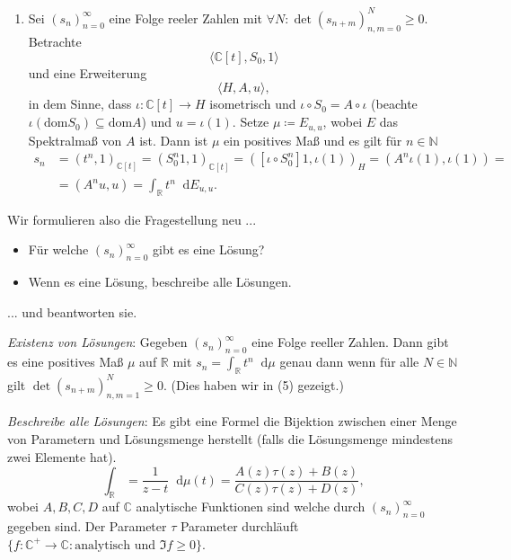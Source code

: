 \documentclass[letterpaper, 11pt]{article}
\newcommand{\R}{\mathbb{R}}
\newcommand{\C}{\mathbb{C}}
\newcommand{\N}{\mathbb{N}}
\newcommand{\1}{\mathds{1}}
\newcommand{\dd}{\mathop{}\!\mathrm{d}}
\theoremstyle{definition}
\begin{document}
\begin{enumerate}
  \item Sei $(s_n)_{n=0}^\infty$ eine Folge reeler Zahlen mit $\forall N : \det (s_{n+m})_{n,m=0}^N \geq 0$. Betrachte
  $$ \langle \C[t], S_0, 1 \rangle $$
  und eine Erweiterung
  $$ \langle H, A, u \rangle, $$
  in dem Sinne, dass $\iota : \C[t] \to H$ isometrisch und $\iota \circ S_0 = A \circ \iota$ (beachte $\iota(\mathrm{dom} S_0) \subseteq \mathrm{dom} A$) und $u = \iota(1)$. Setze $\mu \coloneqq E_{u, u}$, wobei $E$ das Spektralmaß von $A$ ist. Dann ist $\mu$ ein positives Maß und es gilt für $n \in \N$
  \begin{align*}
    s_n &= (t^n, 1)_{\C[t]} = (S_0^n 1, 1)_{\C[t]} = ([\iota \circ S_0^n] 1, \iota(1))_H = (A^n \iota(1), \iota(1)) = \\
    &= (A^n u, u) = \int_\R t^n \dd E_{u, u}.
  \end{align*}
\end{enumerate}

Wir formulieren also die Fragestellung neu ...
\begin{itemize}
  \item Für welche $(s_n)_{n=0}^\infty$ gibt es eine Lösung?
  \item Wenn es eine Lösung, beschreibe alle Lösungen.
\end{itemize}
... und beantworten sie.

\emph{Existenz von Lösungen}: Gegeben $(s_n)_{n=0}^\infty$ eine Folge reeller Zahlen. Dann gibt es eine positives Maß $\mu$ auf $\R$ mit $s_n = \int_\R t^n \dd \mu$ genau dann wenn für alle $N \in \N$ gilt $\det (s_{n+m})_{n,m=1}^N \geq 0$. (Dies haben wir in (5) gezeigt.)

\emph{Beschreibe alle Lösungen}: Es gibt eine Formel die Bijektion zwischen einer Menge von Parametern und Lösungsmenge herstellt (falls die Lösungsmenge mindestens zwei Elemente hat).
$$ \int_\R = \frac{1}{z - t} \dd \mu(t) = \frac{A(z) \tau(z) + B(z)}{C(z) \tau(z) + D(z)}, $$
wobei $A, B, C, D$ auf $\C$ analytische Funktionen sind welche durch $(s_n)_{n=0}^\infty$ gegeben sind. Der Parameter $\tau$ Parameter durchläuft $\{ f : \C^+ \to \C : \textrm{analytisch und } \Im f \geq 0 \}$.
\end{document}
